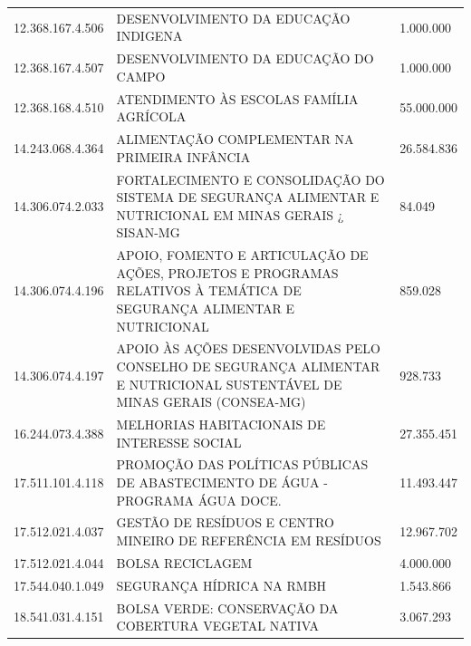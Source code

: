 \documentclass{article}
\begin{document}
\begin{longtable}[c]{m{3cm}|m{12cm}|m{2cm}}
\multicolumn{1}{C{3cm}|}{12.368.167.4.506} & \multicolumn{1}{L{12cm}|}{DESENVOLVIMENTO DA EDUCAÇÃO INDIGENA} & \multicolumn{1}{R{2cm}}{1.000.000} \\
\multicolumn{1}{C{3cm}|}{12.368.167.4.507} & \multicolumn{1}{L{12cm}|}{DESENVOLVIMENTO DA EDUCAÇÃO DO CAMPO} & \multicolumn{1}{R{2cm}}{1.000.000} \\
\multicolumn{1}{C{3cm}|}{12.368.168.4.510} & \multicolumn{1}{L{12cm}|}{ATENDIMENTO ÀS ESCOLAS FAMÍLIA AGRÍCOLA} & \multicolumn{1}{R{2cm}}{55.000.000} \\
\multicolumn{1}{C{3cm}|}{14.243.068.4.364} & \multicolumn{1}{L{12cm}|}{ALIMENTAÇÃO COMPLEMENTAR NA PRIMEIRA INFÂNCIA} & \multicolumn{1}{R{2cm}}{26.584.836} \\
\multicolumn{1}{C{3cm}|}{14.306.074.2.033} & \multicolumn{1}{L{12cm}|}{FORTALECIMENTO E CONSOLIDAÇÃO DO SISTEMA DE SEGURANÇA ALIMENTAR E NUTRICIONAL EM MINAS GERAIS ¿ SISAN-MG} & \multicolumn{1}{R{2cm}}{84.049} \\
\multicolumn{1}{C{3cm}|}{14.306.074.4.196} & \multicolumn{1}{L{12cm}|}{APOIO, FOMENTO E ARTICULAÇÃO DE AÇÕES, PROJETOS E PROGRAMAS RELATIVOS À TEMÁTICA DE SEGURANÇA ALIMENTAR E NUTRICIONAL} & \multicolumn{1}{R{2cm}}{859.028} \\
\multicolumn{1}{C{3cm}|}{14.306.074.4.197} & \multicolumn{1}{L{12cm}|}{APOIO ÀS AÇÕES DESENVOLVIDAS PELO CONSELHO DE SEGURANÇA ALIMENTAR E NUTRICIONAL SUSTENTÁVEL DE MINAS GERAIS (CONSEA-MG)} & \multicolumn{1}{R{2cm}}{928.733} \\
\multicolumn{1}{C{3cm}|}{16.244.073.4.388} & \multicolumn{1}{L{12cm}|}{MELHORIAS HABITACIONAIS DE INTERESSE SOCIAL} & \multicolumn{1}{R{2cm}}{27.355.451} \\
\multicolumn{1}{C{3cm}|}{17.511.101.4.118} & \multicolumn{1}{L{12cm}|}{PROMOÇÃO DAS POLÍTICAS PÚBLICAS DE ABASTECIMENTO DE ÁGUA - PROGRAMA ÁGUA DOCE.} & \multicolumn{1}{R{2cm}}{11.493.447} \\
\multicolumn{1}{C{3cm}|}{17.512.021.4.037} & \multicolumn{1}{L{12cm}|}{GESTÃO DE RESÍDUOS E CENTRO MINEIRO DE REFERÊNCIA EM RESÍDUOS} & \multicolumn{1}{R{2cm}}{12.967.702} \\
\multicolumn{1}{C{3cm}|}{17.512.021.4.044} & \multicolumn{1}{L{12cm}|}{BOLSA RECICLAGEM} & \multicolumn{1}{R{2cm}}{4.000.000} \\
\multicolumn{1}{C{3cm}|}{17.544.040.1.049} & \multicolumn{1}{L{12cm}|}{SEGURANÇA HÍDRICA NA RMBH} & \multicolumn{1}{R{2cm}}{1.543.866} \\
\multicolumn{1}{C{3cm}|}{18.541.031.4.151} & \multicolumn{1}{L{12cm}|}{BOLSA VERDE: CONSERVAÇÃO DA COBERTURA VEGETAL NATIVA} & \multicolumn{1}{R{2cm}}{3.067.293} \\

\end{longtable}
\end{document}
